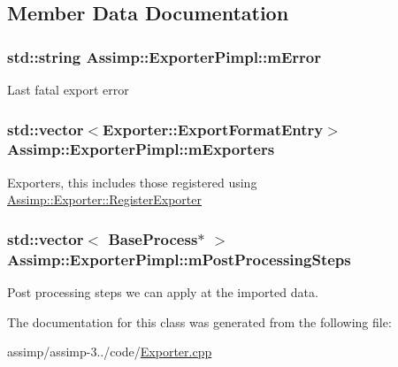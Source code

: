\subsection{Member Data Documentation}
\hypertarget{class_assimp_1_1_exporter_pimpl_a8a892776135cbd3b2eff2270a7dbf254}{
\subsubsection[{m\+Error}]{\setlength{\rightskip}{0pt plus 5cm}std\+::string Assimp\+::\+Exporter\+Pimpl\+::m\+Error}}\label{class_assimp_1_1_exporter_pimpl_a8a892776135cbd3b2eff2270a7dbf254}
Last fatal export error \hypertarget{class_assimp_1_1_exporter_pimpl_a4db7a735e7faf181a69a04d8e5777f87}{
\subsubsection[{m\+Exporters}]{\setlength{\rightskip}{0pt plus 5cm}std\+::vector$<${\bf Exporter\+::\+Export\+Format\+Entry}$>$ Assimp\+::\+Exporter\+Pimpl\+::m\+Exporters}}\label{class_assimp_1_1_exporter_pimpl_a4db7a735e7faf181a69a04d8e5777f87}
Exporters, this includes those registered using \hyperlink{class_assimp_1_1_exporter_a01176fd6be11eb44b792cec46302f8df}{Assimp\+::\+Exporter\+::\+Register\+Exporter} \hypertarget{class_assimp_1_1_exporter_pimpl_a8536b3110b24365d3b8258ab7c08c214}{
\subsubsection[{m\+Post\+Processing\+Steps}]{\setlength{\rightskip}{0pt plus 5cm}std\+::vector$<$ {\bf Base\+Process}$\ast$ $>$ Assimp\+::\+Exporter\+Pimpl\+::m\+Post\+Processing\+Steps}}\label{class_assimp_1_1_exporter_pimpl_a8536b3110b24365d3b8258ab7c08c214}
Post processing steps we can apply at the imported data. 

The documentation for this class was generated from the following file\+:\begin{DoxyCompactItemize}
\item 
assimp/assimp-\/3../code/\hyperlink{_exporter_8cpp}{Exporter.\+cpp}\end{DoxyCompactItemize}
